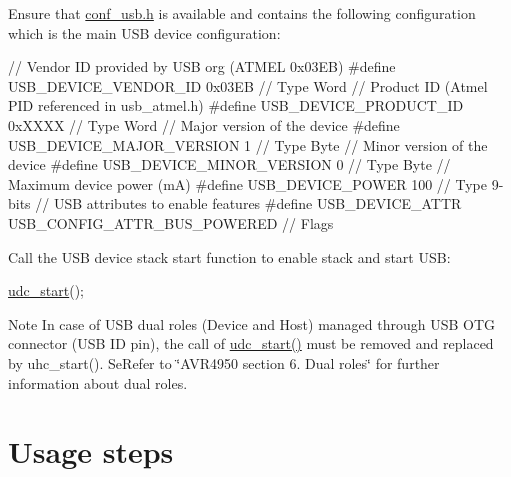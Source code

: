 \begin{DoxyEnumerate}
\item Ensure that \hyperlink{conf__usb_8h}{conf\-\_\-usb.\-h} is available and contains the following configuration which is the main U\-S\-B device configuration\-:
\begin{DoxyItemize}
\item 
\begin{DoxyCode}
 \textcolor{comment}{// Vendor ID provided by USB org (ATMEL 0x03EB)}
\textcolor{preprocessor}{        #define USB\_DEVICE\_VENDOR\_ID 0x03EB // Type Word}
\textcolor{preprocessor}{}        \textcolor{comment}{// Product ID (Atmel PID referenced in usb\_atmel.h)}
\textcolor{preprocessor}{        #define USB\_DEVICE\_PRODUCT\_ID 0xXXXX // Type Word}
\textcolor{preprocessor}{}        \textcolor{comment}{// Major version of the device}
\textcolor{preprocessor}{        #define USB\_DEVICE\_MAJOR\_VERSION 1 // Type Byte}
\textcolor{preprocessor}{}        \textcolor{comment}{// Minor version of the device}
\textcolor{preprocessor}{        #define USB\_DEVICE\_MINOR\_VERSION 0 // Type Byte}
\textcolor{preprocessor}{}        \textcolor{comment}{// Maximum device power (mA)}
\textcolor{preprocessor}{        #define USB\_DEVICE\_POWER 100 // Type 9-bits}
\textcolor{preprocessor}{}        \textcolor{comment}{// USB attributes to enable features}
\textcolor{preprocessor}{        #define USB\_DEVICE\_ATTR USB\_CONFIG\_ATTR\_BUS\_POWERED // Flags }
\end{DoxyCode}

\end{DoxyItemize}
\item Call the U\-S\-B device stack start function to enable stack and start U\-S\-B\-:
\begin{DoxyItemize}
\item 
\begin{DoxyCode}
 \hyperlink{group__udc__group__interne_gadf4e193509cd03ab6333d62629ea51e7}{udc\_start}(); 
\end{DoxyCode}
 \begin{DoxyNote}{Note}
In case of U\-S\-B dual roles (Device and Host) managed through U\-S\-B O\-T\-G connector (U\-S\-B I\-D pin), the call of \hyperlink{group__udc__group__interne_gadf4e193509cd03ab6333d62629ea51e7}{udc\-\_\-start()} must be removed and replaced by uhc\-\_\-start(). Se\-Refer to \char`\"{}\-A\-V\-R4950 section 6. Dual roles\char`\"{} for further information about dual roles. 
\end{DoxyNote}

\end{DoxyItemize}
\end{DoxyEnumerate}\hypertarget{udi_cdc_quickstart_udi_cdc_basic_use_case_usage}{}\section{Usage steps}\label{udi_cdc_quickstart_udi_cdc_basic_use_case_usage}
